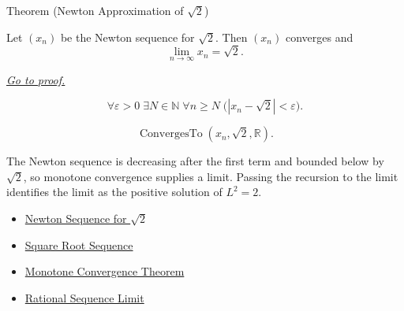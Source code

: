 
\begin{theorembox}{Theorem (Newton Approximation of $\sqrt{2}$)}
\begin{theorem}
\label{thm:newton-approximation-sqrt-two}
Let $(x_n)$ be the Newton sequence for $\sqrt{2}$. Then $(x_n)$ converges
and
\[
  \lim_{n\to\infty}x_n=\sqrt{2}.
\]

\smallskip
\noindent
\hyperref[prf:newton-approximation-sqrt-two]{\textit{Go to proof.}}
\end{theorem}
\end{theorembox}

\begin{remark*}
\[
\forall \varepsilon>0\;\exists N\in\mathbb{N}\;\forall n\ge N
\;\bigl(|x_n-\sqrt{2}|<\varepsilon\bigr).
\]
\end{remark*}

\begin{remark*}
\[
\operatorname{ConvergesTo}(x_n,\sqrt{2},\mathbb{R}).
\]
\end{remark*}

\begin{remark*}[Interpretation]
The Newton sequence is decreasing after the first term and bounded below by
$\sqrt{2}$, so monotone convergence supplies a limit. Passing the recursion
to the limit identifies the limit as the positive solution of $L^2=2$.
\end{remark*}

\begin{dependencies}
\begin{itemize}
  \item \hyperref[def:newton-sequence-sqrt-two]{Newton Sequence for $\sqrt{2}$}
  \item \hyperref[def:square-root-sequence]{Square Root Sequence}
  \item \hyperref[thm:monotone-convergence-theorem]{Monotone Convergence Theorem}
  \item \hyperref[thm:rational-sequence-limit]{Rational Sequence Limit}
\end{itemize}
\end{dependencies}

